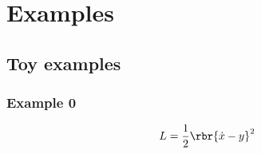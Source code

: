\documentclass[a4paper,11pt]{article}
\begin{document}
% 
% 



\section{Examples}




\subsection{Toy examples}

\subsubsection*{Example 0}
\cite[sec.\ 1.2]{Gitman1990}
\begin{equation}
L = \frac{1}{2}\rbr{\dot{x}-y}^2
\end{equation}
\end{document}

